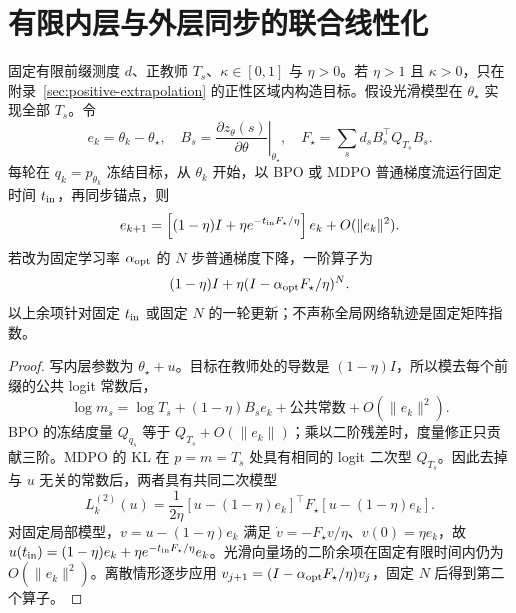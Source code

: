 \section{有限内层与外层同步的联合线性化}
\label{sec:joint-spectrum}
\begin{theorem}
\label{thm:joint-spectrum}
固定有限前缀测度 $d$、正教师 $T_s$、$\kappa\in[0,1]$ 与 $\eta>0$。若 $\eta>1$ 且 $\kappa>0$，只在附录~\ref{sec:positive-extrapolation} 的正性区域内构造目标。假设光滑模型在 $\theta_\star$ 实现全部 $T_s$。令
\begin{equation}
e_k=\theta_k-\theta_\star,\quad
B_s=\left.\frac{\partial z_\theta(s)}{\partial\theta}\right|_{\theta_\star},\quad
F_\star=\sum_s d_sB_s^\top Q_{T_s}B_s.
\end{equation}
每轮在 $q_k=p_{\theta_k}$ 冻结目标，从 $\theta_k$ 开始，以 BPO 或 MDPO 普通梯度流运行固定时间 $t_{\rm in}$，再同步锚点，则
\begin{equation}
e_{k+1}=\left[(1-\eta)I+\eta e^{-t_{\rm in}F_\star/\eta}\right]e_k+O(\|e_k\|^2).
\label{eq:joint-flow-map}
\end{equation}
若改为固定学习率 $\alpha_{\rm opt}$ 的 $N$ 步普通梯度下降，一阶算子为
\begin{equation}
(1-\eta)I+\eta(I-\alpha_{\rm opt}F_\star/\eta)^N.
\label{eq:joint-discrete-map}
\end{equation}
以上余项针对固定 $t_{\rm in}$ 或固定 $N$ 的一轮更新；不声称全局网络轨迹是固定矩阵指数。
\end{theorem}
\begin{proof}
写内层参数为 $\theta_\star+u$。目标在教师处的导数是 $(1-\eta)I$，所以模去每个前缀的公共 logit 常数后，
\begin{equation}
\log m_s=\log T_s+(1-\eta)B_se_k+\text{公共常数}+O(\|e_k\|^2).
\end{equation}
BPO 的冻结度量 $Q_{q_s}$ 等于 $Q_{T_s}+O(\|e_k\|)$；乘以二阶残差时，度量修正只贡献三阶。MDPO 的 KL 在 $p=m=T_s$ 处具有相同的 logit 二次型 $Q_{T_s}$。因此去掉与 $u$ 无关的常数后，两者具有共同二次模型
\begin{equation}
L_k^{(2)}(u)=\frac1{2\eta}[u-(1-\eta)e_k]^\top F_\star[u-(1-\eta)e_k].
\end{equation}
对固定局部模型，$v=u-(1-\eta)e_k$ 满足 $\dot v=-F_\star v/\eta$、$v(0)=\eta e_k$，故 $u(t_{\rm in})=(1-\eta)e_k+\eta e^{-t_{\rm in}F_\star/\eta}e_k$。光滑向量场的二阶余项在固定有限时间内仍为 $O(\|e_k\|^2)$。离散情形逐步应用 $v_{j+1}=(I-\alpha_{\rm opt}F_\star/\eta)v_j$，固定 $N$ 后得到第二个算子。
\end{proof}

